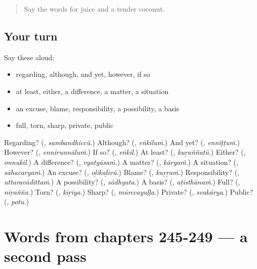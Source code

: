 \begin{quote}
Say the words for juice and a tender coconut.
\end{quote}

\subsection*{Your turn}
Say these aloud:

\begin{itemize}
\raggedright
  \item regarding, although, and yet, however, if so
  \item at least, either, a difference, a matter, a situation
  \item an excuse, blame, responsibility, a possibility, a basis
  \item full, torn, sharp, private, public
\end{itemize}

\begin{tcolorbox}[breakable,colback=teal!4,colframe=teal!35!black,title={Before you move on}]
Regarding? (\textbf{}, \emph{sambandhiccŭ}.) Although? (\textbf{}, \emph{eṅkiluṁ}.) And yet? (\textbf{}, \emph{enniṭṭuṁ}.) However? (\textbf{}, \emph{ennirunnāluṁ}.) If so? (\textbf{}, \emph{eṅkil}.) At least? (\textbf{}, \emph{kuṟaññatŭ}.) Either? (\textbf{}, \emph{onnukil}.) A difference? (\textbf{}, \emph{vyatyāsaṁ}.) A matter? (\textbf{}, \emph{kāryaṁ}.) A situation? (\textbf{}, \emph{sāhacaryaṁ}.) An excuse? (\textbf{}, \emph{oḻikaḻivŭ}.) Blame? (\textbf{}, \emph{kuṟṟaṁ}.) Responsibility? (\textbf{}, \emph{uttaravādittaṁ}.) A possibility? (\textbf{}, \emph{sādhyata}.) A basis? (\textbf{}, \emph{aṭisthānaṁ}.) Full? (\textbf{}, \emph{niṟañña}.) Torn? (\textbf{}, \emph{kīṟiya}.) Sharp? (\textbf{}, \emph{mūrccayuḷḷa}.) Private? (\textbf{}, \emph{svakārya}.) Public? (\textbf{}, \emph{potu}.)
\end{tcolorbox}
\section[(dialogue)]{Words from chapters 245-249 — a second pass}

\label{lesson:ML-R249-second-pass-words-from-chapters-245-249}



